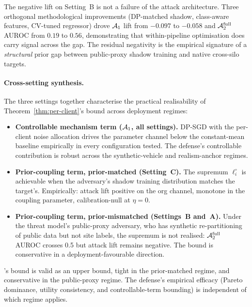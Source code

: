 The negative lift on Setting~B is not a failure of the attack
architecture. Three orthogonal methodological improvements (DP-matched
shadow, class-aware features, CV-tuned regressor) drove $\mathcal{A}_1$ lift
from $-0.097$ to $-0.058$ and $\mathcal{A}_2^{\text{full}}$ AUROC from
$0.19$ to $0.56$, demonstrating that within-pipeline optimisation does
carry signal across the gap. The residual negativity is the empirical
signature of a \emph{structural} prior gap between public-proxy shadow
training and native cross-silo targets.


\paragraph{Cross-setting synthesis.}
The three settings together characterise the practical realisability
of Theorem~\ref{thm:per-client}'s bound across deployment regimes:

\begin{itemize}[topsep=2pt,itemsep=2pt,leftmargin=*]
\item \textbf{Controllable mechanism term ($\mathcal{A}_1$, all settings).}
  DP-SGD with the per-client noise allocation drives the parameter
  channel below the constant-mean baseline empirically in every
  configuration tested. The defense's controllable contribution is
  robust across the synthetic-vehicle and realism-anchor regimes.
\item \textbf{Prior-coupling term, prior-matched (Setting~C).} The
  supremum $\ell_i^\circ$ is achievable when the adversary's shadow
  training distribution matches the target's. Empirically: attack
  lift positive on the org channel, monotone in the coupling
  parameter, calibration-null at $\eta=0$.
\item \textbf{Prior-coupling term, prior-mismatched (Settings~B
  and~A).} Under the threat model's public-proxy adversary, who has
  synthetic re-partitioning of public data but not site labels, the
  supremum is not realised: $\mathcal{A}_2^{\text{full}}$ AUROC crosses 0.5
  but attack lift remains negative. The bound is conservative in a
  deployment-favourable direction.
\end{itemize}

\Fulcrum's bound is valid as an upper bound, tight in the
prior-matched regime, and conservative in the public-proxy regime.
The defense's empirical efficacy (Pareto dominance, utility
consistency, and controllable-term bounding) is independent of which
regime applies.

